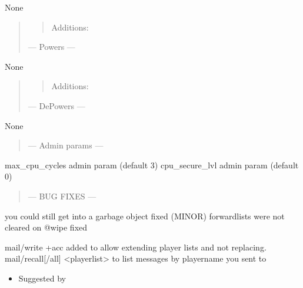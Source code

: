 \documentclass[letterpaper,10pt,english]{sphinxmanual}
\begin{document}
\sphinxAtStartPar
None
\begin{quote}
\begin{quote}

\sphinxAtStartPar
Additions:
\end{quote}

\sphinxAtStartPar
— Powers —
\end{quote}

\sphinxAtStartPar
None
\begin{quote}
\begin{quote}

\sphinxAtStartPar
Additions:
\end{quote}

\sphinxAtStartPar
— De\sphinxhyphen{}Powers —
\end{quote}

\sphinxAtStartPar
None
\begin{quote}

\sphinxAtStartPar
— Admin params —
\end{quote}

\sphinxAtStartPar
max\_cpu\_cycles admin param (default 3)
cpu\_secure\_lvl admin param (default 0)
\begin{quote}

\sphinxAtStartPar
— BUG FIXES —
\end{quote}

\sphinxAtStartPar
you could still get into a garbage object \sphinxhyphen{} fixed (MINOR)
forwardlists were not cleared on @wipe \sphinxhyphen{} fixed

\sphinxAtStartPar
mail/write +acc added to allow extending player lists and not replacing.
mail/recall{[}/all{]} \textless{}playerlist\textgreater{} to list messages by player\sphinxhyphen{}name you sent to
\begin{itemize}
\item {} 
\sphinxAtStartPar
Suggested by 

\end{itemize}
\end{document}
